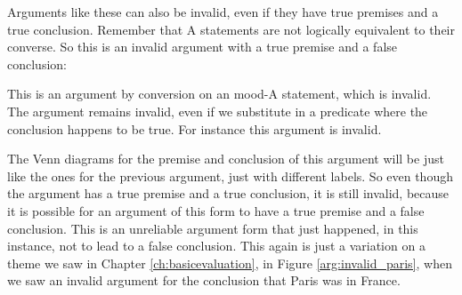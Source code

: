 Arguments like these can also be invalid, even if they have true premises and a true conclusion. Remember that A statements are not logically equivalent to their converse. So this is an invalid argument with a true premise and a false conclusion:

\begin{kormanize}
\end{kormanize}

This is an argument by conversion on an mood-A statement, which is invalid. The argument remains invalid, even if we substitute in a predicate where the conclusion happens to be true. For instance this argument is invalid.

\begin{kormanize}
\end{kormanize}

The Venn diagrams for the premise and conclusion of this argument will be just like the ones for the previous argument, just with different labels. So even though the argument has a true premise and a true conclusion, it is still invalid, because it is possible for an argument of this form to have a true premise and a false conclusion. This is an unreliable argument form that just happened, in this instance, not to lead to a false conclusion. This again is just a variation on a theme we saw in Chapter \ref{ch:basicevaluation}, in Figure \ref{arg:invalid_paris}, when we saw an invalid argument for the conclusion that Paris was in France.
